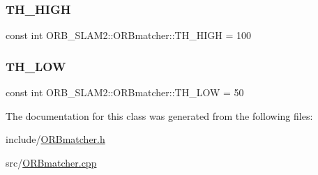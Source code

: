 \subsubsection{\texorpdfstring{T\+H\+\_\+\+H\+I\+GH}{TH\_HIGH}}
{\footnotesize\ttfamily const int O\+R\+B\+\_\+\+S\+L\+A\+M2\+::\+O\+R\+Bmatcher\+::\+T\+H\+\_\+\+H\+I\+GH = 100\hspace{0.3cm}{\ttfamily [static]}}

\mbox{\label{class_o_r_b___s_l_a_m2_1_1_o_r_bmatcher_a810252607722e100efe4c4e941ae00a6}} 
\subsubsection{\texorpdfstring{T\+H\+\_\+\+L\+OW}{TH\_LOW}}
{\footnotesize\ttfamily const int O\+R\+B\+\_\+\+S\+L\+A\+M2\+::\+O\+R\+Bmatcher\+::\+T\+H\+\_\+\+L\+OW = 50\hspace{0.3cm}{\ttfamily [static]}}



The documentation for this class was generated from the following files\+:\begin{DoxyCompactItemize}
\item 
include/\mbox{\hyperlink{_o_r_bmatcher_8h}{O\+R\+Bmatcher.\+h}}\item 
src/\mbox{\hyperlink{_o_r_bmatcher_8cpp}{O\+R\+Bmatcher.\+cpp}}\end{DoxyCompactItemize}
